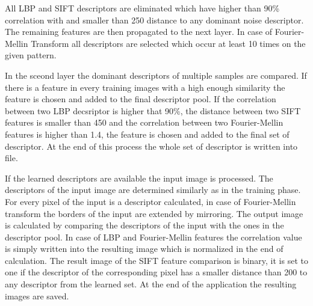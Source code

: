 \documentclass[draft,final]{vutinfth} %
\begin{document}
All LBP and SIFT descriptors are eliminated which have higher than 90\% correlation with and smaller than 250 distance to any dominant noise descriptor.
The remaining features are then propagated to the next layer.
In case of Fourier-Mellin Transform all descriptors are selected which occur at least 10 times on the given pattern.
\par
In the sceond layer the dominant descriptors of multiple samples are compared.
If there is a feature in every training images with a high enough similarity the feature is chosen and added to the final descriptor pool.
If the correlation between two LBP decsriptor is higher that 90\%, the distance between two SIFT features is smaller than 450 and the correlation between two Fourier-Mellin features is higher than 1.4, the feature is chosen and added to the final set of descriptor.
At the end of this process the whole set of descriptor is written into file.
\par
If the learned descriptors are available the input image is processed.
The descriptors of the input image are determined similarly as in the training phase.
For every pixel of the input is a descriptor calculated, in case of Fourier-Mellin transform the borders of the input are extended by mirroring.
The output image is calculated by comparing the descriptors of the input with the ones in the descriptor pool.
In case of LBP and Fourier-Mellin features the correlation value is simply written into the resulting image which is normalized in the end of calculation.
The result image of the SIFT feature comparison is binary, it is set to one if the descriptor of the corresponding pixel has a smaller distance than 200 to any descriptor from the learned set.
At the end of the application the resulting images are saved.
\end{document}
